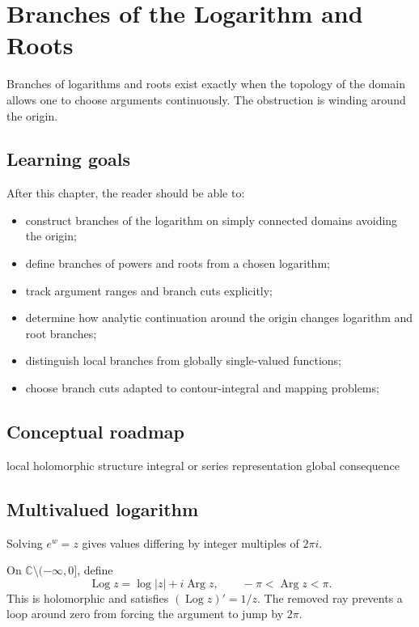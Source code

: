 \chapter{Branches of the Logarithm and Roots}
\label{ch:iv14}

Branches of logarithms and roots exist exactly when the topology of the domain allows one to choose arguments continuously. The obstruction is winding around the origin.

\section*{Learning goals}
After this chapter, the reader should be able to:
\begin{itemize}
\item construct branches of the logarithm on simply connected domains avoiding the origin;
\item define branches of powers and roots from a chosen logarithm;
\item track argument ranges and branch cuts explicitly;
\item determine how analytic continuation around the origin changes logarithm and root branches;
\item distinguish local branches from globally single-valued functions;
\item choose branch cuts adapted to contour-integral and mapping problems;
\end{itemize}
\section*{Conceptual roadmap}
\volroadmap
  {local holomorphic structure}
  {integral or series representation}
  {global consequence}

\section{Multivalued logarithm}
Solving $e^w=z$ gives values differing by integer multiples of $2\pi i$.

\begin{example}\label{ex:iv14-expand-01}
On \(\mathbb C\setminus(-\infty,0]\), define
\[
\operatorname{Log}z=\log|z|+i\operatorname{Arg}z,\qquad -\pi<\operatorname{Arg}z<\pi.
\]
This is holomorphic and satisfies \((\operatorname{Log}z)'=1/z\). The removed ray prevents a loop around zero from forcing the argument to jump by \(2\pi\).
\end{example}
